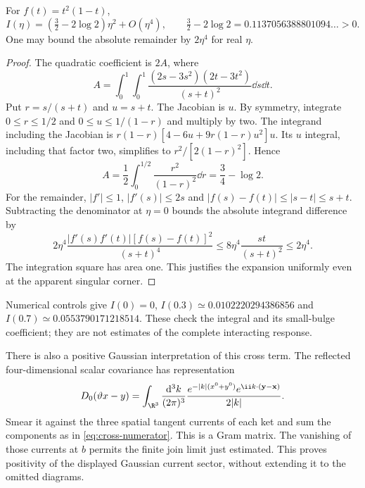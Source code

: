 \begin{proposition}\label{prop:bulge-coefficient}
For $f(t)=t^2(1-t)$,
\begin{equation}\label{eq:bulge-coefficient}
 I(\eta)=(\tfrac32-2\log2)\eta^2+O(\eta^4),\qquad
 \tfrac32-2\log2=0.1137056388801094\ldots>0.
\end{equation}
One may bound the absolute remainder by $2\eta^4$ for real $\eta$.
\end{proposition}
\begin{proof}
The quadratic coefficient is $2A$, where
\begin{equation}
 A=\int_0^1\!\int_0^1
 \frac{(2s-3s^2)(2t-3t^2)}{(s+t)^2}\dd s\dd t.
\end{equation}
Put $r=s/(s+t)$ and $u=s+t$. The Jacobian is $u$.
By symmetry, integrate $0\leq r\leq1/2$ and
$0\leq u\leq1/(1-r)$ and multiply by two. The integrand including
the Jacobian is
$r(1-r)[4-6u+9r(1-r)u^2]u$.
Its $u$ integral, including that factor two, simplifies to
$r^2/[2(1-r)^2]$. Hence
\begin{equation}
 A=\frac12\int_0^{1/2}\frac{r^2}{(1-r)^2}\dd r
 =\frac34-\log2.
\end{equation}
For the remainder, $|f'|\leq1$, $|f'(s)|\leq2s$ and
$|f(s)-f(t)|\leq|s-t|\leq s+t$. Subtracting the denominator at
$\eta=0$ bounds the absolute integrand difference by
\begin{equation}
 2\eta^4\frac{|f'(s)f'(t)|[f(s)-f(t)]^2}{(s+t)^4}
 \leq8\eta^4\frac{st}{(s+t)^2}\leq2\eta^4.
\end{equation}
The integration square has area one. This justifies the expansion
uniformly even at the apparent singular corner.
\end{proof}

Numerical controls give $I(0)=0$,
$I(0.3)\simeq0.0102220294386856$ and
$I(0.7)\simeq0.0553790171218514$. These check the integral and its
small-bulge coefficient; they are not estimates of the complete
interacting response.

There is also a positive Gaussian interpretation of this cross term.
The reflected four-dimensional scalar covariance has representation
\begin{equation}
 D_0(\vartheta x-y)=\int_{\R^3}\frac{\mathrm d^3k}{(2\pi)^3}
 \frac{e^{-|k|(x^0+y^0)}e^{\ii k\cdot(\mathbf y-\mathbf x)}}{2|k|}.
\end{equation}
Smear it against the three spatial tangent currents of each ket and
sum the components as in \eqref{eq:cross-numerator}. This is a Gram
matrix. The vanishing of those currents at $b$ permits the finite
join limit just estimated. This proves positivity of the displayed
Gaussian current sector, without extending it to the omitted diagrams.

